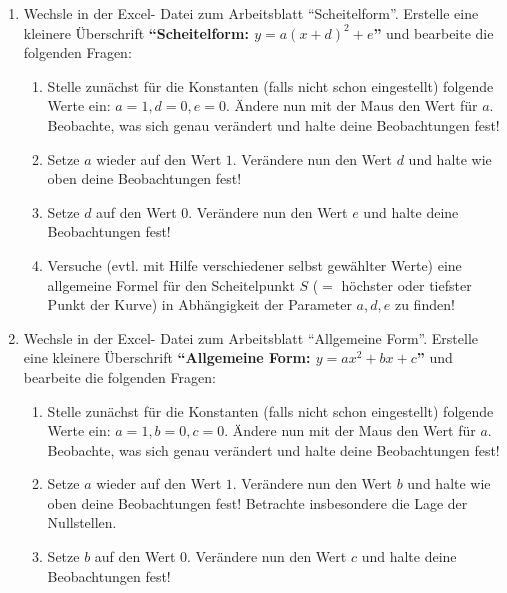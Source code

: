 \documentclass[a4paper, twoside, parskip, 10pt, smallheadings]{scrbook}
\theoremstyle{plain}
\theoremstyle{definition}
\begin{document}
\begin{enumerate}

\item Wechsle in der Excel- Datei zum Arbeitsblatt "`Scheitelform"'. 
Erstelle  eine kleinere Überschrift
\textbf{"`Scheitelform: $y=a(x+d)^2+e$"'} und bearbeite die
folgenden Fragen:

\begin{enumerate}

\item Stelle zunächst für die Konstanten (falls nicht schon
eingestellt) folgende Werte ein: $a=1,d=0,e=0$. Ändere nun mit der
Maus den Wert für $a$. Beobachte, was sich genau verändert und
halte deine Beobachtungen fest!

\item Setze $a$ wieder auf den Wert $1$. Verändere nun den Wert
$d$ und halte wie oben deine Beobachtungen fest!

\item Setze $d$ auf den Wert $0$. Verändere nun den Wert $e$ und
halte deine Beobachtungen fest!

\item Versuche (evtl. mit Hilfe verschiedener selbst gewählter
Werte) eine allgemeine Formel für den Scheitelpunkt $S$ ($=$
höchster oder tiefster Punkt der Kurve) in Abhängigkeit der
Parameter $a,d,e$ zu finden!

\end{enumerate}

\item Wechsle in der Excel- Datei zum Arbeitsblatt "`Allgemeine
Form"'. Erstelle 
 eine kleinere Überschrift
\textbf{"`Allgemeine Form: $y=ax^2+bx+c$"'} und bearbeite die
folgenden Fragen:

\begin{enumerate}

\item Stelle zunächst für die Konstanten (falls nicht schon
eingestellt) folgende Werte ein: $a=1,b=0,c=0$. Ändere nun mit der
Maus den Wert für $a$. Beobachte, was sich genau verändert und
halte deine Beobachtungen fest!

\item Setze $a$ wieder auf den Wert $1$. Verändere nun den Wert
$b$ und halte wie oben deine Beobachtungen fest! Betrachte
insbesondere die Lage der Nullstellen.

\item Setze $b$ auf den Wert $0$. Verändere nun den Wert $c$ und
halte deine Beobachtungen fest!


\end{enumerate}
\end{enumerate}
\end{document}
